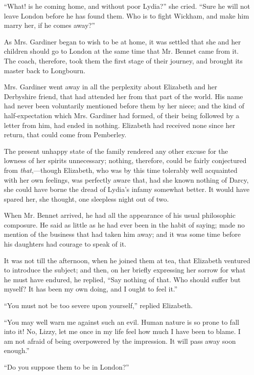 \documentclass[12pt,openright]{book}
\begin{document}
“What! is he coming home, and without poor Lydia?” she cried. “Sure he will not leave London before he has found them. Who is to fight Wickham, and make him marry her, if he comes away?”

As Mrs. Gardiner began to wish to be at home, it was settled that she and her children should go to London at the same time that Mr. Bennet came from it. The coach, therefore, took them the first stage of their journey, and brought its master back to Longbourn.

Mrs. Gardiner went away in all the perplexity about Elizabeth and her Derbyshire friend, that had attended her from that part of the world. His name had never been voluntarily mentioned before them by her niece; and the kind of half-expectation which Mrs. Gardiner had formed, of their being followed by a letter from him, had ended in nothing. Elizabeth had received none since her return, that could come from Pemberley.

The present unhappy state of the family rendered any other excuse for the lowness of her spirits unnecessary; nothing, therefore, could be fairly conjectured from \textit{that},—though Elizabeth, who was by this time tolerably well acquainted with her own feelings, was perfectly aware that, had she known nothing of Darcy, she could have borne the dread of Lydia’s infamy somewhat better. It would have spared her, she thought, one sleepless night out of two.

When Mr. Bennet arrived, he had all the appearance of his usual philosophic composure. He said as little as he had ever been in the habit of saying; made no mention of the business that had taken him away; and it was some time before his daughters had courage to speak of it.

It was not till the afternoon, when he joined them at tea, that Elizabeth ventured to introduce the subject; and then, on her briefly expressing her sorrow for what he must have endured, he replied, “Say nothing of that. Who should suffer but myself? It has been my own doing, and I ought to feel it.”

“You must not be too severe upon yourself,” replied Elizabeth.

“You may well warn me against such an evil. Human nature is so prone to fall into it! No, Lizzy, let me once in my life feel how much I have been to blame. I am not afraid of being overpowered by the impression. It will pass away soon enough.”

“Do you suppose them to be in London?”
\end{document}
